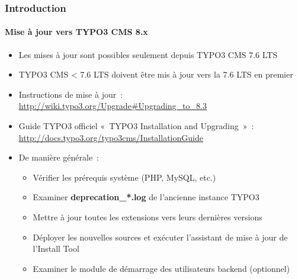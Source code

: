 \begin{frame}[fragile]
	\frametitle{Introduction}
	\framesubtitle{Mise à jour vers TYPO3 CMS 8.x}

	\begin{itemize}
		\item Les mises à jour sont possibles seulement depuis TYPO3 CMS 7.6 LTS
		\item TYPO3 CMS < 7.6 LTS doivent être mis à jour vers la 7.6 LTS en premier
	\end{itemize}

	\begin{itemize}

		\item Instructions de mise à jour~:\newline
			\smaller\url{http://wiki.typo3.org/Upgrade#Upgrading_to_8.3}\normalsize
		\item Guide TYPO3 officiel «~TYPO3 Installation and Upgrading~»~:
			\smaller\url{http://docs.typo3.org/typo3cms/InstallationGuide}\normalsize
		\item De manière générale~:
			\begin{itemize}
				\item Vérifier les prérequis système \small(PHP, MySQL, etc.)
				\item Examiner \textbf{deprecation\_*.log} de l'ancienne instance TYPO3
				\item Mettre à jour toutes les extensions vers leurs dernières versions
				\item Déployer les nouvelles sources et exécuter l'assistant de mise à jour de l'Install Tool
				\item Examiner le module de démarrage des utilisateurs backend (optionnel)
			\end{itemize}
	\end{itemize}

\end{frame}


